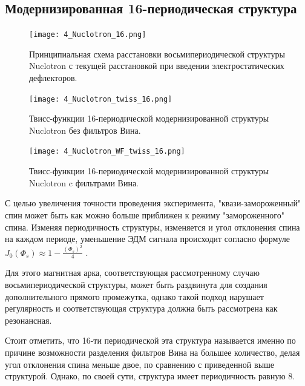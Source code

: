 \newpage
	\subsection{Модернизированная 16-периодическая структура}\label{sec:EDM/optics/16period}

\begin{figure}[!h]
  \centering
   \texttt{[image: 4\_Nuclotron\_16.png]}
   \caption{Принципиальная схема расстановки восьмипериодической структуры Nuclotron с текущей расстановкой при введении электростатических дефлекторов.}
   \label{fig:4_Nuclotron_16}
\end{figure}

\begin{figure}[!h]
  \centering
   \texttt{[image: 4\_Nuclotron\_twiss\_16.png]}
   \caption{Твисс-функции 16-периодической модернизированной структуры Nuclotron без фильтров Вина.}
   \label{fig:4_Nuclotron_twiss_16}
\end{figure}

\begin{figure}[!h]
  \centering
   \texttt{[image: 4\_Nuclotron\_WF\_twiss\_16.png]}
   \caption{Твисс-функции 16-периодической модернизированной структуры Nuclotron c фильтрами Вина.}
   \label{fig:4_Nuclotron_twiss_16}
\end{figure}

\par С целью увеличения точности проведения эксперимента, "квази-замороженный" спин может быть как можно больше приближен к режиму "замороженного" спина. Изменяя периодичность структуры, изменяется и угол отклонения спина на каждом периоде, уменьшение ЭДМ сигнала происходит согласно формуле $J_0\left(\Phi_s\right) \approx 1-\frac{\left(\Phi_s\right)^2}{4}$  \cite{Senichev:2023_nuclotron}. 

\par Для этого магнитная арка, соответствующая рассмотренному случаю восьмипериодической структуры, может быть раздвинута для создания дополнительного прямого промежутка, однако такой подход нарушает регулярность и соответствующая структура должна быть рассмотрена как резонансная.

\par Стоит отметить, что 16-ти периодической эта структура называется именно по причине возможности разделения фильтров Вина на большее количество, делая угол отклонения спина меньше двое, по сравнению с приведенной выше структурой. Однако, по своей сути, структура имеет периодичность равную 8.

